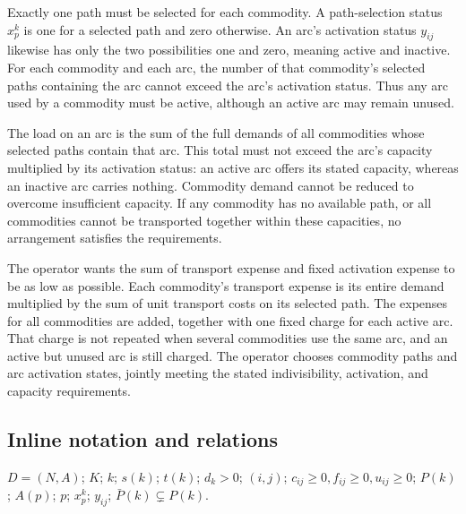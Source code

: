 \documentclass[10pt]{article}
\begin{document}
Exactly one path must be selected for each commodity. A path-selection status $x_p^k$ is one for a selected path and zero otherwise. An arc's activation status $y_{ij}$ likewise has only the two possibilities one and zero, meaning active and inactive. For each commodity and each arc, the number of that commodity's selected paths containing the arc cannot exceed the arc's activation status. Thus any arc used by a commodity must be active, although an active arc may remain unused.

The load on an arc is the sum of the full demands of all commodities whose selected paths contain that arc. This total must not exceed the arc's capacity multiplied by its activation status: an active arc offers its stated capacity, whereas an inactive arc carries nothing. Commodity demand cannot be reduced to overcome insufficient capacity. If any commodity has no available path, or all commodities cannot be transported together within these capacities, no arrangement satisfies the requirements.

The operator wants the sum of transport expense and fixed activation expense to be as low as possible. Each commodity's transport expense is its entire demand multiplied by the sum of unit transport costs on its selected path. The expenses for all commodities are added, together with one fixed charge for each active arc. That charge is not repeated when several commodities use the same arc, and an active but unused arc is still charged. The operator chooses commodity paths and arc activation states, jointly meeting the stated indivisibility, activation, and capacity requirements.

\subsection*{Inline notation and relations}
$D=(N,A)$; $K$; $k$; $s(k)$; $t(k)$; $d_k>0$; $(i,j)$; $c_{ij}\ge0,f_{ij}\ge0,u_{ij}\ge0$; $P(k)$; $A(p)$; $p$; $x_p^k$; $y_{ij}$; $\bar P(k)\subsetneq P(k)$.
\end{document}
